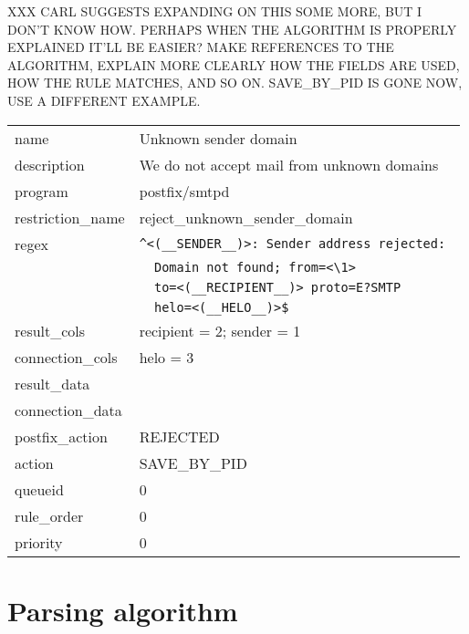 \documentclass[a4paper,12pt,draft]{article}
\begin{document}
XXX CARL SUGGESTS EXPANDING ON THIS SOME MORE, BUT I DON'T KNOW HOW\@.
PERHAPS WHEN THE ALGORITHM IS PROPERLY EXPLAINED IT'LL BE EASIER\@?  MAKE
REFERENCES TO THE ALGORITHM, EXPLAIN MORE CLEARLY HOW THE FIELDS ARE USED,
HOW THE RULE MATCHES, AND SO ON\@.  SAVE\_BY\_PID IS GONE NOW, USE A
DIFFERENT EXAMPLE.

\begin{tabular}[]{ll}

name                & Unknown sender domain                             \\
description         & We do not accept mail from unknown domains        \\
program             & postfix/smtpd                                     \\
restriction\_name   & reject\_unknown\_sender\_domain                   \\
regex               & \verb!^<(__SENDER__)>: Sender address rejected: ! \\
                    & \verb!  Domain not found; from=<\1> !             \\
                    & \verb!  to=<(__RECIPIENT__)> proto=E?SMTP !       \\
                    & \verb!  helo=<(__HELO__)>$!                       \\
result\_cols        & recipient = 2; sender = 1                         \\
connection\_cols    & helo = 3                                          \\
result\_data        &                                                   \\
connection\_data    &                                                   \\
postfix\_action     & REJECTED                                          \\
action              & SAVE\_BY\_PID                                     \\
queueid             & 0                                                 \\
rule\_order         & 0                                                 \\
priority            & 0                                                 \\

\end{tabular}


\section{Parsing algorithm}
\end{document}
